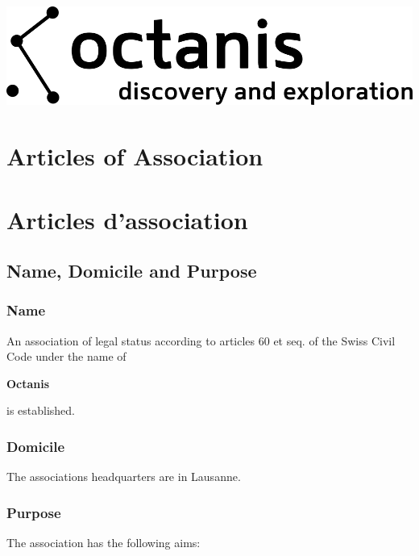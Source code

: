 \documentclass[12pt,a4paper,oneside]{article}
\newcounter{art}
\newcommand{\english}{    \switchcolumn[0]\noindent}
\newcommand{\french}{    \switchcolumn[1]\noindent}
\begin{document}
\begin{center}
	\includegraphics{octanis_org_logo_large}
\end{center}

\begin{paracol}{2}\sloppy



\english
	\section*{Articles of Association}
 	
\french
	\section*{Articles d'association}




\english
	\subsection{Name, Domicile and Purpose}
	\subsubsection{Name}
	An association of legal status according to articles 60 et  seq.  of  the  Swiss  Civil  Code under the name of
	\begin{center}
		\textbf{Octanis}
	\end{center}
	is established.

\english
	\subsubsection{Domicile}
	The associations headquarters are in Lausanne. 

\english
	\subsubsection{Purpose}
	The association has the following aims:


\end{paracol}
\end{document}
